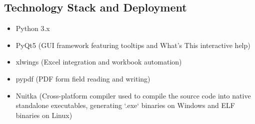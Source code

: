 \documentclass[11pt,a4paper]{article}
\begin{document}
\subsection{Technology Stack and Deployment}
\begin{itemize}
    \item Python 3.x
    \item PyQt5 (GUI framework featuring tooltips and What's This interactive help)
    \item xlwings (Excel integration and workbook automation)
    \item pypdf (PDF form field reading and writing)
    \item Nuitka (Cross-platform compiler used to compile the source code into native standalone executables, generating `.exe` binaries on Windows and ELF binaries on Linux)
\end{itemize}
\end{document}

